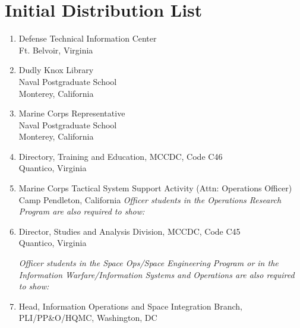 \documentclass[twoside,thesis,twoauthors]{npsreport}
\begin{document}
\chapter*{Initial Distribution List}
\singlespace
\begin{enumerate}
\item Defense Technical Information Center\\Ft. Belvoir, Virginia
\item Dudly Knox Library\\Naval Postgraduate School\\Monterey, California
\item Marine Corps Representative\\Naval Postgraduate School\\Monterey, California
\item Directory, Training and Education, MCCDC, Code C46\\Quantico, Virginia
\item Marine Corps Tactical System Support Activity (Attn: Operations
  Officer)\\Camp Pendleton, California
\textit{Officer students in the Operations Research Program are also required
to show:}

\item Director, Studies and Analysis Division, MCCDC, Code C45\\
Quantico, Virginia

\textit{Officer students in the Space Ops/Space Engineering Program or in the
Information Warfare/Information Systems and Operations are also
required to show:}

\item Head, Information Operations and Space Integration Branch,\\
PLI/PP\&O/HQMC, Washington, DC
\end{enumerate}
\end{document}
